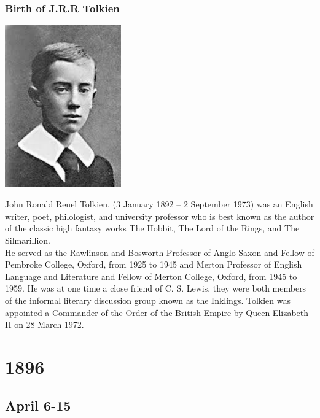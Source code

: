 \documentclass[11pt]{report}
\begin{document}
\subsection{Birth of J.R.R Tolkien}
\vspace{2mm}\begin{center}\includegraphics[width=5cm]{./img/youngTolkien.jpg}\end{center}
John Ronald Reuel Tolkien, (3 January 1892 – 2 September 1973) was an English writer, poet, philologist, and university professor who is best known as the author of the classic high fantasy works The Hobbit, The Lord of the Rings, and The Silmarillion.\\
He served as the Rawlinson and Bosworth Professor of Anglo-Saxon and Fellow of Pembroke College, Oxford, from 1925 to 1945 and Merton Professor of English Language and Literature and Fellow of Merton College, Oxford, from 1945 to 1959. He was at one time a close friend of C. S. Lewis, they were both members of the informal literary discussion group known as the Inklings. Tolkien was appointed a Commander of the Order of the British Empire by Queen Elizabeth II on 28 March 1972.

\chapter{1896}
\section{April 6-15}
\end{document}
